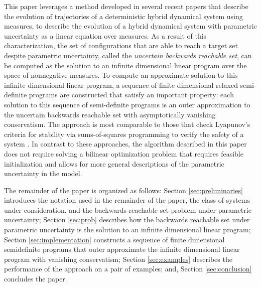 This paper leverages a method developed in several recent papers \cite{henrion2014convex,majumdar2014convex,shia2014convex} that describe the evolution of trajectories of a deterministic hybrid dynamical system using measures, to describe the evolution of a hybrid dynamical system with parametric uncertainty as a linear equation over measures.
As a result of this characterization, the set of configurations that are able to reach a target set despite parametric uncertainty, called the \emph{uncertain backwards reachable set}, can be computed as the solution to an infinite dimensional linear program over the space of nonnegative measures.
To compute an approximate solution to this infinite dimensional linear program, a sequence of finite dimensional relaxed semi-definite programs are constructed that satisfy an important property:
each solution to this sequence of semi-definite programs is an outer approximation to the uncertain backwards reachable set with asymptotically vanishing conservatism.
The approach is most comparable to those that check Lyapunov's criteria for stability via sums-of-squares programming to verify the safety of a system \cite{prajna2004safety}.
In contrast to these approaches, the algorithm described in this paper does not require solving a bilinear optimization problem that requires feasible initialization and allows for more general descriptions of the parametric uncertainty in the model.

The remainder of the paper is organized as follows:
Section \ref{sec:preliminaries} introduces the notation used in the remainder of the paper, the class of systems under consideration, and the backwards reachable set problem under parametric uncertainty;
Section \ref{sec:prob} describes how the backwards reachable set under parametric uncertainty is the solution to an infinite dimensional linear program;
Section \ref{sec:implementation} constructs a sequence of finite dimensional semidefinite programs that outer approximate the infinite dimensional linear program with vanishing conservatism;
Section \ref{sec:examples} describes the performance of the approach on a pair of examples;
and, Section \ref{sec:conclusion} concludes the paper.
